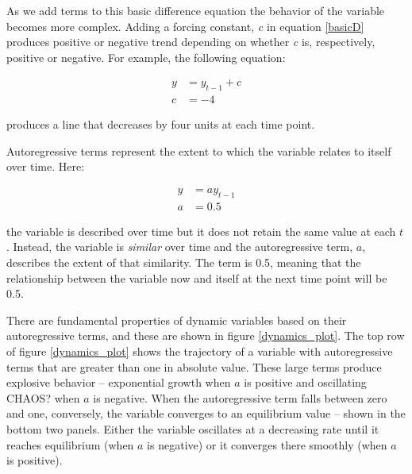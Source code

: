 \documentclass[english,,man]{apa6}
\theoremstyle{definition}
\theoremstyle{definition}
\theoremstyle{definition}
\theoremstyle{remark}
\begin{document}
As we add terms to this basic difference equation the behavior of the
variable becomes more complex. Adding a forcing constant, \emph{c} in
equation \ref{basicD} produces positive or negative trend depending on
whether \emph{c} is, respectively, positive or negative. For example,
the following equation:

\begin{equation}
\begin{split}
\label{diffC}
y &= y_{t-1} + c \\ 
c &= -4
\end{split}
\end{equation}

\noindent produces a line that decreases by four units at each time
point.

Autoregressive terms represent the extent to which the variable relates
to itself over time. Here:

\begin{equation}
\begin{split}
\label{diffA}
y &= a y_{t-1} \\ 
a &= 0.5
\end{split}
\end{equation}

\noindent the variable is described over time but it does not retain the
same value at each \(t\). Instead, the variable is \emph{similar} over
time and the autoregressive term, \(a\), describes the extent of that
similarity. The term is 0.5, meaning that the relationship between the
variable now and itself at the next time point will be 0.5.

There are fundamental properties of dynamic variables based on their
autoregressive terms, and these are shown in figure \ref{dynamics_plot}.
The top row of figure \ref{dynamics_plot} shows the trajectory of a
variable with autoregressive terms that are greater than one in absolute
value. These large terms produce explosive behavior -- exponential
growth when \(a\) is positive and oscillating CHAOS? when \(a\) is
negative. When the autoregressive term falls between zero and one,
conversely, the variable converges to an equilibrium value -- shown in
the bottom two panels. Either the variable oscillates at a decreasing
rate until it reaches equilibrium (when \(a\) is negative) or it
converges there smoothly (when \(a\) is positive).
\end{document}
